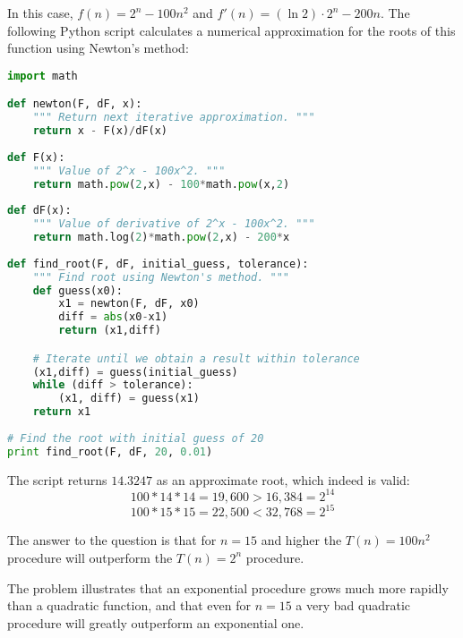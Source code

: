 \documentclass[a4paper,12pt]{article}
\begin{document}
In this case, $f(n) = 2^n - 100n^2$ and $f'(n) = (\ln 2) \cdot 2^n - 200 n$.
The following Python script calculates a numerical approximation for the roots of this function using Newton's method:


\begin{lstlisting}[language=Python]
import math

def newton(F, dF, x):
    """ Return next iterative approximation. """
    return x - F(x)/dF(x)
    
def F(x):
    """ Value of 2^x - 100x^2. """
    return math.pow(2,x) - 100*math.pow(x,2)
    
def dF(x):
    """ Value of derivative of 2^x - 100x^2. """
    return math.log(2)*math.pow(2,x) - 200*x
    
def find_root(F, dF, initial_guess, tolerance):
    """ Find root using Newton's method. """
    def guess(x0):
        x1 = newton(F, dF, x0)
        diff = abs(x0-x1)
        return (x1,diff)

    # Iterate until we obtain a result within tolerance                                                   
    (x1,diff) = guess(initial_guess)
    while (diff > tolerance):
        (x1, diff) = guess(x1)
    return x1
    
# Find the root with initial guess of 20                                                                                            
print find_root(F, dF, 20, 0.01)
\end{lstlisting}

The script returns $14.3247$ as an approximate root, which indeed is valid:
\[ 100 * 14 * 14 = 19,600 > 16,384 = 2^{14} \]
\[ 100 * 15 * 15 = 22,500 < 32,768 = 2^{15} \]

The answer to the question is that for $n=15$ and higher the $T(n) = 100n^2$ procedure will 
outperform the $T(n) = 2^n$ procedure. 

The problem illustrates that an exponential procedure 
grows much more rapidly than a quadratic function, 
and that even for $n = 15$ a very bad quadratic procedure will greatly outperform an exponential one.
\end{document}
